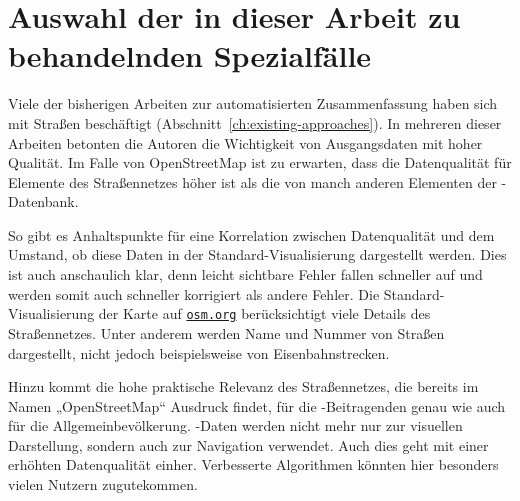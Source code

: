 \documentclass[../main/thesis.tex]{subfiles}
\begin{document}


%





\section{Auswahl der in dieser Arbeit zu behandelnden Spezialfälle}

Viele der bisherigen Arbeiten zur automatisierten Zusammenfassung haben sich mit Straßen beschäftigt (Abschnitt~\ref{ch:existing-approaches}).
In mehreren dieser Arbeiten betonten die Autoren die Wichtigkeit von Ausgangsdaten mit hoher Qualität.
Im Falle von OpenStreetMap ist zu erwarten, dass die Datenqualität für Elemente des Straßennetzes höher ist als die von manch anderen Elementen der \osm-Datenbank.

So gibt es Anhaltspunkte für eine Korrelation zwischen Datenqualität und dem Umstand, ob diese Daten in der Standard-Visualisierung dargestellt werden. 
Dies ist auch anschaulich klar, denn leicht sichtbare Fehler fallen schneller auf und werden somit auch schneller korrigiert als andere Fehler.
Die Standard-Visualisierung der Karte auf \href{https://www.openstreetmap.org/}{\nolinkurl{osm.org}} berücksichtigt viele Details des Straßennetzes.
Unter anderem werden Name und Nummer von Straßen dargestellt, nicht jedoch beispielsweise von Eisenbahnstrecken.

Hinzu kommt die hohe praktische Relevanz des Straßennetzes, die bereits im Namen „OpenStreetMap“ Ausdruck findet, für die \osm-Beitragenden genau wie auch für die Allgemeinbevölkerung.
\osm-Daten werden nicht mehr nur zur visuellen Darstellung, sondern auch zur Navigation verwendet.
Auch dies geht mit einer erhöhten Datenqualität einher. 
Verbesserte Algorithmen könnten hier besonders vielen Nutzern zugutekommen.
\end{document}
